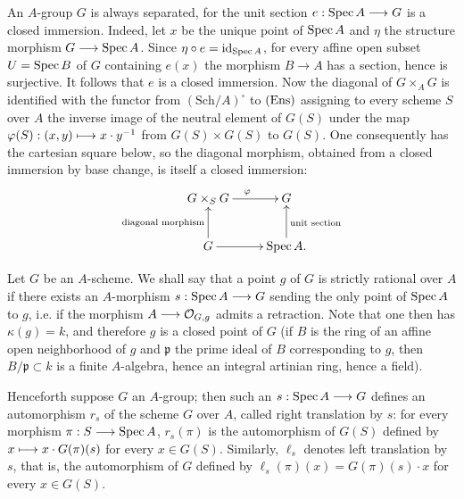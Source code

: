 An $A$-group $G$ is always separated, for the unit section $e:\operatorname{Spec} A\longrightarrow G$ is a closed immersion. Indeed, let $x$ be the unique point of $\operatorname{Spec} A$ and $\eta$ the structure morphism $G\longrightarrow\operatorname{Spec} A$. Since $\eta\circ e=\mathrm{id}_{\operatorname{Spec} A}$, for every affine open subset $U=\operatorname{Spec} B$ of $G$ containing $e(x)$ the morphism $B\to A$ has a section, hence is surjective. It follows that $e$ is a closed immersion. Now the diagonal of $G\times_AG$ is identified with the functor from $(\mathrm{Sch}/A)^\circ$ to $\textup{(Ens)}$ assigning to every scheme $S$ over $A$ the inverse image of the neutral element of $G(S)$ under the map $\varphi(S):(x,y)\longmapsto x\cdot y^{-1}$ from $G(S)\times G(S)$ to $G(S)$. One consequently has the cartesian square below, so the diagonal morphism, obtained from a closed immersion by base change, is itself a closed immersion:
\[
\xymatrix{G\times_SG\ar[r]^\varphi&G\\G\ar[u]^{\text{diagonal morphism}}\ar[r]&\Spec A\ar[u]_{\text{unit section}}.}
\]

Let $G$ be an $A$-scheme. We shall say that a point $g$ of $G$ is strictly rational over $A$ if there exists an $A$-morphism $s:\operatorname{Spec} A\longrightarrow G$ sending the only point of $\operatorname{Spec} A$ to $g$, i.e. if the morphism $A\longrightarrow\mathcal{O}_{G,g}$ admits a retraction. Note that one then has $\kappa(g)=k$, and therefore $g$ is a closed point of $G$ (if $B$ is the ring of an affine open neighborhood of $g$ and $\mathfrak p$ the prime ideal of $B$ corresponding to $g$, then $B/\mathfrak p\subset k$ is a finite $A$-algebra, hence an integral artinian ring, hence a field).

Henceforth suppose $G$ an $A$-group; then such an $s:\operatorname{Spec} A\longrightarrow G$ defines an automorphism $r_s$ of the scheme $G$ over $A$, called right translation by $s$: for every morphism $\pi:S\longrightarrow\operatorname{Spec} A$, $r_s(\pi)$ is the automorphism of $G(S)$ defined by $x\longmapsto x\cdot G(\pi)(s)$ for every $x\in G(S)$. Similarly, $\ell_s$ denotes left translation by $s$, that is, the automorphism of $G$ defined by $\ell_s(\pi)(x)=G(\pi)(s)\cdot x$ for every $x\in G(S)$.

